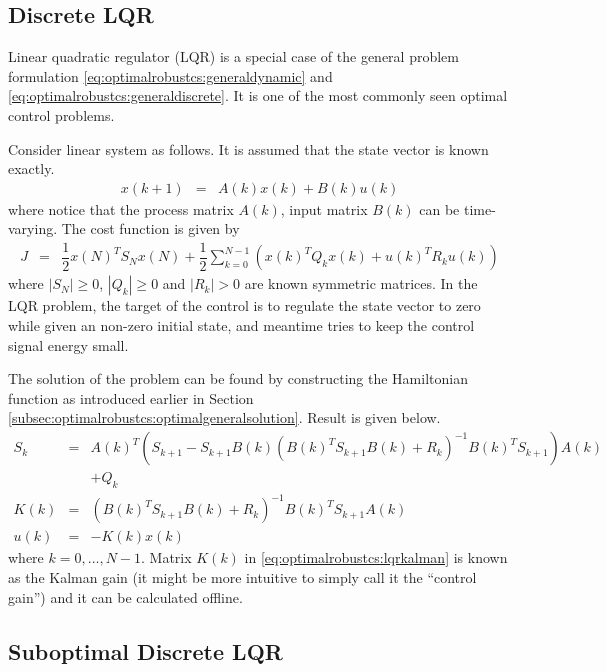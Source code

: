 \subsection{Discrete LQR}

Linear quadratic regulator (LQR) is a special case of the general problem formulation \eqref{eq:optimalrobustcs:generaldynamic} and \eqref{eq:optimalrobustcs:generaldiscrete}. It is one of the most commonly seen optimal control problems.

Consider linear system as follows. It is assumed that the state vector is known exactly.
\begin{eqnarray}
	x(k+1) &=& A(k)x(k) + B(k)u(k) \nonumber
\end{eqnarray}
where notice that the process matrix $A(k)$, input matrix $B(k)$ can be time-varying. The cost function is given by
\begin{eqnarray}
	J &=& \dfrac{1}{2}x(N)^TS_Nx(N) + \dfrac{1}{2}\sum_{k=0}^{N-1}\left(x(k)^TQ_kx(k) + u(k)^TR_ku(k)\right) \nonumber
\end{eqnarray}
where $|S_N|\geq 0$, $|Q_k| \geq 0$ and $|R_k| >0$ are known symmetric matrices. In the LQR problem, the target of the control is to regulate the state vector to zero while given an non-zero initial state, and meantime tries to keep the control signal energy small.

The solution of the problem can be found by constructing the Hamiltonian function as introduced earlier in Section \ref{subsec:optimalrobustcs:optimalgeneralsolution}. Result is given below.
\begin{eqnarray}
	S_k &=& A(k)^T\left(S_{k+1}-S_{k+1}B(k)\left(B(k)^TS_{k+1}B(k) + R_k\right)^{-1}B(k)^TS_{k+1}\right)A(k)  \nonumber \\ && + Q_k \label{eq:optimalrobustcs:srecursive} \\
	K(k) &=& \left(B(k)^TS_{k+1}B(k) + R_k\right)^{-1}B(k)^TS_{k+1}A(k) \label{eq:optimalrobustcs:lqrkalman} \\
	u(k) &=& -K(k)x(k) \nonumber
\end{eqnarray}
where $k=0,\ldots, N-1$. Matrix $K(k)$ in \eqref{eq:optimalrobustcs:lqrkalman} is known as the Kalman gain (it might be more intuitive to simply call it the ``control gain'') and it can be calculated offline.

\subsection{Suboptimal Discrete LQR} \label{subsec:suboptimaldiscretelqr}

